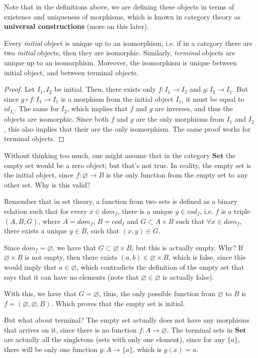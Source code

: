 Note that in the definitions above, we are defining these objects in terms of existence and
uniqueness of morphisms, which is known in category theory as \textbf{universal constructions}
(more on this later).

\begin{theorem}
	Every \textit{initial} object is unique up to an isomorphism, i.e. if in a category there
	are two \textit{initial} objects, then they are isomorphic.
	Similarly, \textit{terminal} objects are unique up to an isomorphism.
	Moreover, the isomorphism is unique between initial object, and between terminal objects.
\end{theorem}
\begin{proof}
	Let $I_1, I_2$ be initial. Then, there exists only $f:I_1 \to I_2$ and $g:I_2 \to I_1$.
	But since $g \circ f:I_1 \to I_1$ is a morphism from the initial object $I_1$, it must
	be equal to $id_{I_1}$. The same for $I_2$, which implies that $f$ and $g$ are inverses,
	and thus the objects are isomorphic. Since both $f$ and $g$ are the only morphisms from
	$I_1$ and $I_2$, this also implies that their are the only isomorphism.
	The same proof works for terminal objects.
\end{proof}


\begin{example}
	Without thinking too much, one might assume that in the category $\mathbf{Set}$
	the empty set would be a zero object; but that's not true.
	In reality, the empty set is the initial object, since $f:\varnothing \to B$
	is the only function from the empty set to any other set. Why is this valid?

	Remember that in set theory, a function from two sets is defined as a binary
	relation such that for every $x \in dom_f$, there is a unique $y \in cod_f$, i.e.
	$f$ is a triple $(A,B,G)$, where $A = dom_f$, $B = cod_f$ and $G \subset A \times B$
	such that $\forall x \in dom_f$, there exists a unique $y \in B$, such that $(x,y) \in G$.

	Since $dom_f = \varnothing$, we have that $G \subset \varnothing \times B$, but this
	is actually empty. Why? If $\varnothing \times B$ is not empty, then there exists
	$(a,b) \in \varnothing \times B$, which is false, since this would imply that
	$a \in \varnothing$, which contradicts the definition of the empty set that says
	that it can have no elements (note that $\varnothing \in \varnothing$ is actually false).

	With this, we have that $G = \varnothing$, thus, the only possible function from
	$\varnothing$ to $B$ is $f = (\varnothing, \varnothing, B)$. Which proves that the
	empty set is initial.

	But what about terminal? The empty set actually does not have any morphisms
	that arrives on it, since there is no function $f:A \to \varnothing$.
	The terminal sets in $\mathbf{Set}$ are actually all the singletons (sets with only
	one element), since for any $\{a\}$, there will be only one function
	$g: A \to \{a\}$, which is $g(x) = a$.
	\label{ex:InitialTerminalSet}
\end{example}

